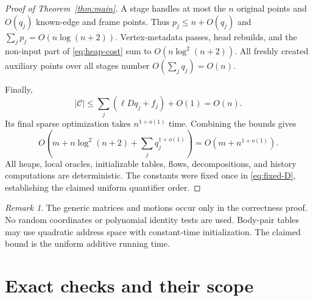 \documentclass[11pt,a4paper]{article}
\theoremstyle{definition}
\theoremstyle{remark}
\newtheorem{remark}[theorem]{Remark}
\begin{document}
\begin{proof}[Proof of Theorem~\ref{thm:main}]
A stage handles at most the $n$ original
points and $O(q_j)$ known-edge and frame
points. Thus $p_j\leq n+O(q_j)$ and
$\sum_jp_j=O(n\log(n+2))$.
Vertex-metadata passes, head rebuilds, and
the non-input part of \eqref{eq:heap-cost}
sum to $O(n\log^2(n+2))$.
All freshly created auxiliary points over
all stages number $O(\sum_jq_j)=O(n)$.

Finally,
\[
 |\mathcal C|
 \leq\sum_j(\ell Dq_j+f_j)+O(1)=O(n).
\]
Its final sparse optimization takes
$n^{1+o(1)}$ time.
Combining the bounds gives
\[
 O\!\left(m+n\log^2(n+2)
       +\sum_jq_j^{1+o(1)}\right)
 =O(m+n^{1+o(1)}).
\]
All heaps, local oracles, initializable tables,
flows, decompositions, and history computations
are deterministic. The constants were fixed
once in \eqref{eq:fixed-D}, establishing the
claimed uniform quantifier order.
\end{proof}

\begin{remark}
The generic matrices and motions occur only
in the correctness proof. No random coordinates
or polynomial identity tests are used.
Body-pair tables may use quadratic address space
with constant-time initialization. The claimed
bound is the uniform additive running time.
\end{remark}

\section{Exact checks and their scope}
\label{sec:checks}
\end{document}
